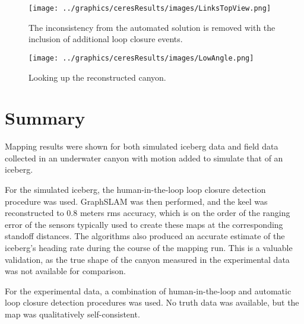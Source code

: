  \begin{figure}[!htb]
   \centering
   \texttt{[image: ../graphics/ceresResults/images/LinksTopView.png]} %
   \caption{The inconsistency from the automated solution is removed with the inclusion of additional loop closure events.}
   \label{fig:RealDataSolution4}
\end{figure}

 \begin{figure}[!htb]
   \centering
   \texttt{[image: ../graphics/ceresResults/images/LowAngle.png]} %
   \caption{Looking up the reconstructed canyon.}
   \label{fig:RealDataSolution5}
\end{figure}

\section{Summary}

Mapping results were shown for both simulated iceberg data and field data collected in an underwater canyon with motion added to simulate that of an iceberg. 

For the simulated iceberg, the human-in-the-loop loop closure detection procedure was used. GraphSLAM was then performed, and the keel was reconstructed to 0.8 meters rms accuracy, which is on the order of the ranging error of the sensors typically used to create these maps at the corresponding standoff distances. The algorithms also produced an accurate estimate of the iceberg's heading rate during the course of the mapping run. This is a valuable validation, as the true shape of the canyon measured in the experimental data was not available for comparison.

For the experimental data, a combination of human-in-the-loop and automatic loop closure detection procedures was used. No truth data was available, but the map was qualitatively self-consistent. 


